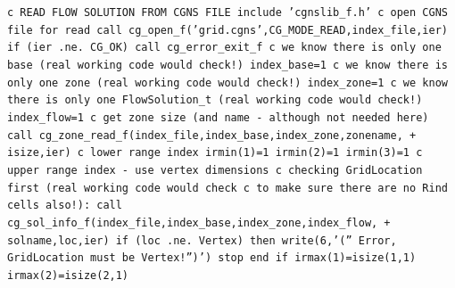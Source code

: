 \documentclass[12pt]{article}
\begin{document}
{\tt \noindent c  READ FLOW SOLUTION FROM CGNS FILE
\newline\indent      include 'cgnslib\_f.h'
\newline c  open CGNS file for read
\newline\indent      call cg\_open\_f('grid.cgns',CG\_MODE\_READ,index\_file,ier)
\newline\indent      if (ier .ne. CG\_OK) call cg\_error\_exit\_f
\newline c  we know there is only one base (real working code would check!)
\newline\indent      index\_base=1
\newline c  we know there is only one zone (real working code would check!)
\newline\indent      index\_zone=1
\newline c  we know there is only one FlowSolution\_t (real working code would check!)
\newline\indent      index\_flow=1
\newline c   get zone size (and name - although not needed here)
\newline\indent      call cg\_zone\_read\_f(index\_file,index\_base,index\_zone,zonename,
\newline + \indent isize,ier)
\newline c   lower range index
\newline\indent      irmin(1)=1
\newline\indent      irmin(2)=1
\newline\indent      irmin(3)=1
\newline c   upper range index - use vertex dimensions
\newline c   checking GridLocation first (real working code would check
\newline c   to make sure there are no Rind cells also!):
\newline\indent      call cg\_sol\_info\_f(index\_file,index\_base,index\_zone,index\_flow,
\newline + \indent solname,loc,ier)
\newline\indent      if (loc .ne. Vertex) then
\newline\indent\indent        write(6,'('' Error, GridLocation must be Vertex!'')')
\newline\indent\indent        stop
\newline\indent      end if
\newline\indent      irmax(1)=isize(1,1)
\newline\indent      irmax(2)=isize(2,1)
}
\end{document}
